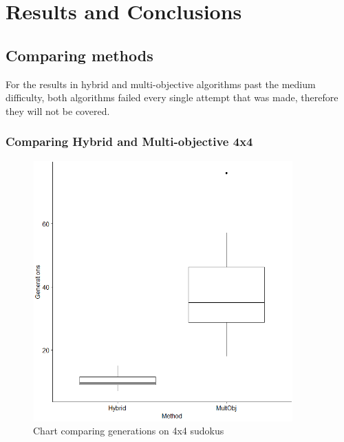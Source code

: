 \documentclass[a4paper,11pt]{article}
\begin{document}
\section{Results and Conclusions}

\subsection{Comparing methods}
For the results in hybrid and multi-objective algorithms past the medium difficulty, both algorithms failed every single attempt that was made, therefore they will not be covered.
\subsubsection{Comparing Hybrid and Multi-objective 4x4}

\begin{figure}[h]
	\centering
	\includegraphics[height=10cm,width=10cm]{./Diagrams/barChartComparing4x4}
	\caption{Chart comparing generations on 4x4 sudokus}
\end{figure}
\end{document}
